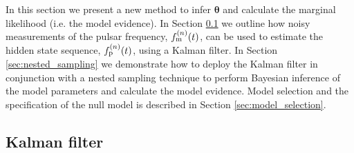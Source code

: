 \documentclass[fleqn,usenatbib,useAMS]{mnras}
\begin{document}
In this section we present a new method to infer $\boldsymbol{\theta}$ and calculate the marginal likelihood (i.e. the model evidence). In Section \ref{sec:kalman_filter} we outline how noisy measurements of the pulsar frequency, $f_{\rm m}^{(n)}(t)$, can be used to estimate the hidden state sequence, $f_{\rm p}^{(n)}(t)$, using a Kalman filter. In Section \ref{sec:nested_sampling} we demonstrate how to deploy the Kalman filter in conjunction with a nested sampling technique to perform Bayesian inference of the model parameters and calculate the model evidence. Model selection and the specification of the null model is described in Section \ref{sec:model_selection}. 


\subsection{Kalman filter}\label{sec:kalman_filter}
\end{document}
